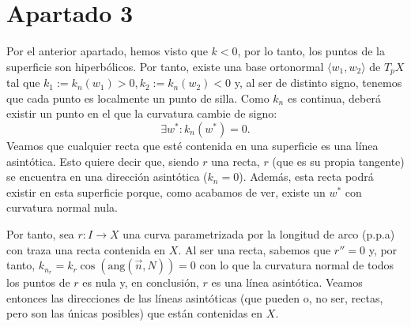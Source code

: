 \section{Apartado 3}
Por el anterior apartado, hemos visto que $k < 0$, por lo tanto, los puntos de
la superficie son hiperbólicos. Por tanto, existe una base ortonormal $\langle
w_1, w_2 \rangle$ de $T_pX$ tal que $k_1 := k_n \left( w_1 \right) > 0, k_2 :=
k_n \left( w_2 \right) < 0$ y, al ser de distinto signo, tenemos que cada punto
es localmente un punto de silla. Como $k_n$ es continua, deberá existir un punto
en el que la curvatura cambie de signo:
\[
\exists w^* : k_n\left( w^* \right) = 0.
\]
Veamos que cualquier recta que esté contenida en una superficie es una línea
asintótica. Esto quiere decir que, siendo $r$ una recta, $r$ (que es su propia
tangente) se encuentra en una dirección asintótica ($k_n = 0$). Además, esta
recta podrá existir en esta superficie porque, como acabamos de ver, existe un
$w^*$ con curvatura normal nula.

Por tanto, sea $r: I \rightarrow X$ una curva parametrizada por la longitud de
arco (p.p.a) con traza una recta contenida en $X$. Al ser una recta,
sabemos que $r'' = 0$ y, por tanto, $k_{n_r} = k_r \cos \left(
\mathrm{ang}\left( \overrightarrow{n}, N \right) \right) = 0$ con lo que la
curvatura normal de todos los puntos de $r$ es nula y, en conclusión, $r$ es una
línea asintótica. Veamos entonces las direcciones de las líneas asintóticas (que
pueden o, no ser, rectas, pero son las únicas posibles) que están contenidas en
$X$.


